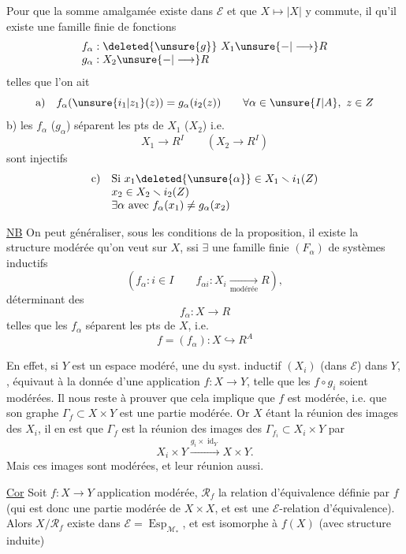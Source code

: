 Pour que la somme amalgamée existe dans  $\mathcal E$ et que $X\mapsto|X|$ y commute, il  qu'il existe une famille finie de  fonctions
\[
\begin{array}{l}
f_\alpha:\deleted{\unsure{g}}\ X_1\unsure{-|\longrightarrow}R\\
g_\alpha:X_2\unsure{-|\longrightarrow}R
\end{array}
\]
telles que l'on ait
\[
\text{a)}\quad f_\alpha(\unsure{i_1|z_1}(z))=g_\alpha(i_2(z))\qquad\forall\alpha\in\unsure{I|A},\ z\in Z
\]
b)  les $f_\alpha$ ($g_\alpha$) séparent  les pts de $X_1$ ($X_2$) i.e.
\[
 X_1\longrightarrow R^I\qquad(X_2\longrightarrow R^I)
\]
sont injectifs
\[
\begin{array}{ll}
\text{c)}&\text{Si }x_1\deleted{\unsure{\alpha}}\in X_1\smallsetminus i_1(Z)\\
&x_2\in X_2\smallsetminus i_2(Z)\\
&\exists\alpha\text{ avec }f_\alpha(x_1)\ne g_\alpha(x_2)
\end{array}
\]

\uline{NB} On peut généraliser, sous les conditions de la proposition, il existe la structure modérée qu'on veut sur $X$, ssi $\exists$ une famille finie $(F_\alpha)$  de systèmes inductifs
\[
 (f_\alpha:i\in I\qquad f_{\alpha i}:X_i\underset{\text{modérée}}{\longrightarrow}R),
\]
déterminant des
\[
 f_\alpha:X\longrightarrow R
\]
telles que les $f_\alpha$ séparent les pts de $X$, i.e.
\[
 f=(f_\alpha):X\hookrightarrow R^A
\]

En effet, si $Y$ est un espace modéré, une   du syst. inductif $(X_i)$ (dans $\mathcal E$) dans $Y$, , équivaut à la donnée d'une application $f:X\longrightarrow Y$, telle que les $f\circ g_i$ soient modérées. Il nous reste à prouver que cela implique que $f$ est modérée, i.e. que son graphe $\Gamma_f\subset X\times Y$ est une partie modérée. Or $X$ étant la réunion des images des $X_i$, il en est que $\Gamma_f$ est la réunion des images des $\Gamma_{f_i}\subset X_i\times Y$ par
\[
 X_i\times Y\xrightarrow{g_i\times\operatorname{id}_Y}X\times Y.
\]
Mais ces images sont modérées, et  leur réunion aussi.

\uline{Cor} Soit $f:X\longrightarrow Y$ application modérée, $\mathcal R_f$ la relation d'équivalence définie par $f$ (qui est donc une partie modérée de $X\times X$, et est une $\mathcal E$-relation d'équivalence). Alors $X/\mathcal R_f$ existe dans $\mathcal E=\operatorname{Esp}_{\mathcal M_*}$, et est  isomorphe à $f(X)$ (avec structure induite)

